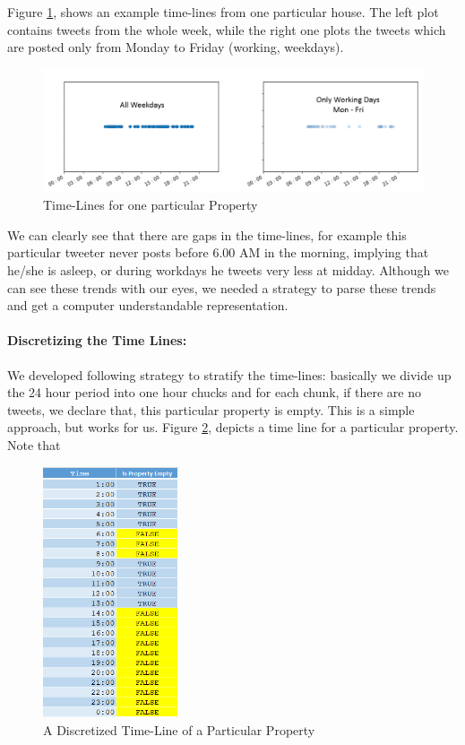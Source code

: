 \documentclass[12pt]{report}
\theoremstyle{named}
\begin{document}
Figure \ref{fig:ExampleTimeLine}, shows an example time-lines from one particular house. The left plot contains tweets from the whole week, while the right one plots the tweets which are posted only from Monday to Friday (working, weekdays).

\begin{figure}[ht]
\centering
        \includegraphics[width=150mm,scale=1]{Images/ExampleTimelines.PNG}
    \caption{Time-Lines for one particular Property}
    \label{fig:ExampleTimeLine}
\end{figure}

We can clearly see that there are gaps in the time-lines, for example this particular tweeter never posts before 6.00 AM in the morning, implying that he/she is asleep, or during workdays he tweets very less at midday. Although we can see these trends with our eyes, we needed a strategy to parse these trends and get a computer understandable representation. 
\paragraph{Discretizing the Time Lines:\\}
We developed following strategy to stratify the time-lines: basically we divide up the 24 hour period into one hour chucks and for each chunk, if there are no tweets, we declare that, this particular property is empty. This is a simple approach, but works for us. Figure \ref{fig:DiscritizedTimeLine}, depicts a time line for a particular property.
Note that 
\begin{figure}[ht]
\centering
        \includegraphics[width=40mm,scale=0.5]{Images/DiscritizedTimeLine.PNG}
    \caption{A Discretized Time-Line of a Particular Property}
    \label{fig:DiscritizedTimeLine}
\end{figure}
\end{document}
